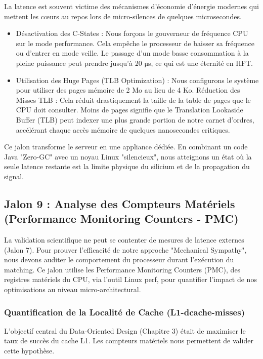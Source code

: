 La latence est souvent victime des mécanismes d'économie d'énergie modernes qui mettent les cœurs au repos lors de micro-silences de quelques microsecondes.

\begin{itemize}
    \item Désactivation des C-States : Nous forçons le gouverneur de fréquence CPU sur le mode performance. Cela empêche le processeur de baisser sa fréquence ou d'entrer en mode veille. Le passage d'un mode basse consommation à la pleine puissance peut prendre jusqu'à 20 µs, ce qui est une éternité en HFT.
    \item Utilisation des Huge Pages (TLB Optimization) : Nous configurons le système pour utiliser des pages mémoire de 2 Mo au lieu de 4 Ko.
        \subitem Réduction des Misses TLB : Cela réduit drastiquement la taille de la table de pages que le CPU doit consulter. Moins de pages signifie que le Translation Lookaside Buffer (TLB) peut indexer une plus grande portion de notre carnet d'ordres, accélérant chaque accès mémoire de quelques nanosecondes critiques.
\end{itemize}

Ce jalon transforme le serveur en une appliance dédiée. En combinant un code Java "Zero-GC" avec un noyau Linux "silencieux", nous atteignons un état où la seule latence restante est la limite physique du silicium et de la propagation du signal.

\subsection{Jalon 9 : Analyse des Compteurs Matériels (Performance Monitoring Counters - PMC)}

La validation scientifique ne peut se contenter de mesures de latence externes (Jalon 7). Pour prouver l'efficacité de notre approche "Mechanical Sympathy", nous devons auditer le comportement du processeur durant l'exécution du matching. Ce jalon utilise les Performance Monitoring Counters (PMC), des registres matériels du CPU, via l'outil Linux perf, pour quantifier l'impact de nos optimisations au niveau micro-architectural.

\subsubsection{Quantification de la Localité de Cache (L1-dcache-misses)}

L'objectif central du Data-Oriented Design (Chapitre 3) était de maximiser le taux de succès du cache L1. Les compteurs matériels nous permettent de valider cette hypothèse.

